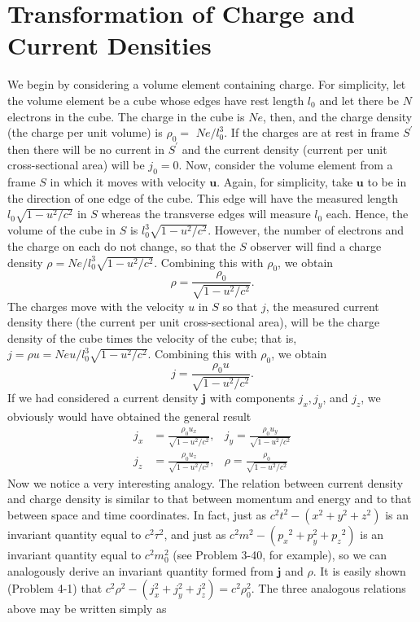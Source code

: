 \section{Transformation of Charge and Current Densities}
We begin by considering a volume element containing charge. For simplicity, let the volume element be a cube whose edges have rest length $l_{0}$ and let there be $N$ electrons in the cube. The charge in the cube is $N e$, then, and the charge density (the charge per unit volume) is $\rho_{0}=$ $N e / l_{0}^{3}$. If the charges are at rest in frame $S^{\prime}$ then there will be no current in $S^{\prime}$ and the current density (current per unit cross-sectional area) will be $j_{0}=0$. Now, consider the volume element from a frame $S$ in which it moves with velocity $\mathbf{u}$. Again, for simplicity, take $\mathbf{u}$ to be in the direction of one edge of the cube. This edge will have the measured length $l_{0} \sqrt{1-u^{2} / c^{2}}$ in $S$ whereas the transverse edges will measure $l_{0}$ each. Hence, the volume of the cube in $S$ is $l_{0}^{3} \sqrt{1-u^{2} / c^{2}}$. However, the number of electrons and the charge on each do not change, so that the $S$ observer will find a charge density $\rho=N e / l_{0}^{3} \sqrt{1-u^{2} / c^{2}}$. Combining this with $\rho_{0}$, we obtain
$$
\rho=\frac{\rho_{0}}{\sqrt{1-u^{2} / c^{2}}} .
$$
The charges move with the velocity $u$ in $S$ so that $j$, the measured current density there (the current per unit cross-sectional area), will be the charge density of the cube times the velocity of the cube; that is, $j=\rho u=N e u / l_{0}^{3} \sqrt{1-u^{2} / c^{2}}$. Combining this with $\rho_{0}$, we obtain
$$
j=\frac{\rho_{0} u}{\sqrt{1-u^{2} / c^{2}}} .
$$
If we had considered a current density $\mathbf{j}$ with components $j_{x}, j_{y}$, and $j_{z}$, we obviously would have obtained the general result
$$
\begin{aligned}
j_{x} &=\frac{\rho_{0} u_{x}}{\sqrt{1-u^{2} / c^{2}}}, & j_{y}=\frac{\rho_{0} u_{y}}{\sqrt{1-u^{2} / c^{2}}} \\
j_{z} &=\frac{\rho_{0} u_{z}}{\sqrt{1-u^{2} / c^{2}}}, & \rho=\frac{\rho_{0}}{\sqrt{1-u^{2} / c^{2}}}
\end{aligned}
$$
Now we notice a very interesting analogy. The relation between current density and charge density is similar to that between momentum and energy and to that between space and time coordinates. In fact, just as $c^{2} t^{2}-\left(x^{2}+y^{2}+z^{2}\right)$ is an invariant quantity equal to $c^{2} \tau^{2}$, and just as $c^{2} m^{2}-\left({p_{x}}^{2}+p_{y}^{2}+p_{z}{ }^{2}\right)$ is an invariant quantity equal to $c^{2} m_{0}^{2}$ (see Problem 3-40, for example), so we can analogously derive an invariant quantity formed from $\mathbf{j}$ and $\rho$. It is easily shown (Problem 4-1) that $c^{2} \rho^{2}-\left(j_{x}^{2}+j_{y}^{2}+j_{z}^{2}\right)=c^{2} \rho_{0}^{2}$. The three analogous relations above may be written simply as
